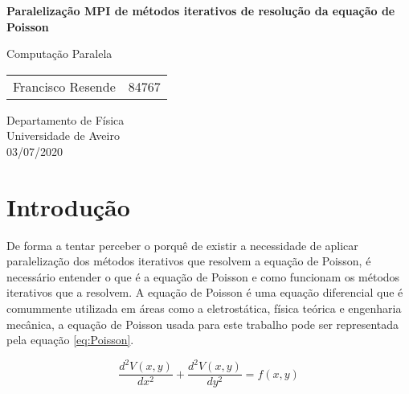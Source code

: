 \documentclass[10pt]{extarticle}
\begin{document}
\begin{titlepage}
	\begin{center}
		
		\vspace{3cm}
		\Large
		\textbf{Paralelização MPI de métodos iterativos de resolução da equação de Poisson}
		
		\normalsize
		\vspace{0.5cm}
		Computação Paralela
		
		\vspace{1.5cm}
		\begin{tabular}{lr}
			Francisco Resende & 84767 \\
		\end{tabular}
		
		\vfill
		
		Departamento de Física\\
		\vspace{0.1cm}
		Universidade de Aveiro\\
		\vspace{0.1cm}
		03/07/2020
	\end{center}
\end{titlepage}

\tableofcontents
\cleardoublepage

\listoftables
\cleardoublepage

\listoffigures
\cleardoublepage

\lstlistoflistings
\cleardoublepage


\section{Introdução} \label{sec:Intro}
	
 De forma a tentar perceber o porquê de existir a necessidade de aplicar paralelização dos métodos iterativos que resolvem a equação de Poisson, é necessário entender o que é a equação de Poisson e como funcionam os métodos iterativos que a resolvem. A equação de Poisson é uma equação diferencial que é comummente utilizada em áreas como a eletrostática, física teórica e engenharia mecânica, a equação de Poisson usada para este trabalho pode ser representada pela equação \ref{eq:Poisson}.
 
 \begin{equation} \label{eq:Poisson}
 \frac{d^2V(x,y)}{dx^2}+\frac{d^2V(x,y)}{dy^2}=f(x,y)
 \end{equation}
		
\end{document}
